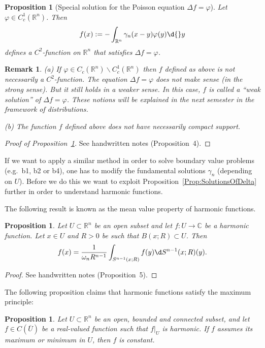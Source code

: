 \documentclass[12pt, oneside, a4paper]{article}
\newtheorem{prop}[thm]{Proposition}
\theoremstyle{dfn}
\newtheorem{rem}[thm]{Remark}
\def\Rbb{\ensuremath{\mathbb{R}}}
\newcommand{\Com}{\mathbb{C}}
\begin{document}
\begin{prop}[Special solution for the Poisson equation $\Delta f = \varphi$]\label{Prop:SolPoissonEq}
Let $\varphi \in C^1_c(\Rbb^n)$. Then
\[
f(x) := -\int_{\Rbb^n} \gamma_n(x-y) \varphi(y) \d{}y
\]
defines a $C^2$-function on $\Rbb^n$ that satisfies $\Delta f = \varphi$.
\end{prop}

\begin{rem}
(a) If $\varphi \in C_c(\Rbb^n) \smallsetminus C^1_c(\Rbb^n)$ then $f$ defined as above is not necessarily a $C^2$-function. The equation $\Delta f = \varphi$ does not make sense (in the strong sense). But it still holds in a weaker sense. In this case, $f$ is called a ``weak solution'' of $\Delta f = \varphi$. These notions will be explained in the next semester in the framework of distributions.

(b) The function $f$ defined above does not have necessarily compact support.
\end{rem}

\begin{proof}[Proof of Proposition~\ref{Prop:SolPoissonEq}]
See handwritten notes (Proposition~4). %
\end{proof}

If we want to apply a similar method in order to solve boundary value problems (e.g.\ b1, b2 or b4), one has to modify the fundamental solutions $\gamma_n$ (depending on $U$). Before we do this we want to exploit Proposition~\ref{Prop:SolutionsOfDelta} further in order to understand harmonic functions.

The following result is known as the mean value property of harmonic functions.

\begin{prop}\label{Prop:MeanValueProperty}
Let $U \subset \Rbb^n$ be an open subset and let $f \colon U \to \Com$ be a harmonic function. Let $x \in U$ and $R > 0$ be such that $B(x;R) \subset U$. Then
\[
f(x) = \frac{1}{\omega_n R^{n-1}} \int_{S^{n-1}(x;R)} f(y) \d S^{n-1}(x;R)(y).
\]
\end{prop}

\begin{proof}
See handwritten notes (Proposition~5). %
\end{proof}

The following proposition claims that harmonic functions satisfy the maximum principle:

\begin{prop}\label{Prop:MaximumPrinciple}
Let $U \subset \Rbb^n$ be an open, bounded and connected subset, and let $f \in C(\overline{U})$ be a real-valued function such that $f|_U$ is harmonic. If $f$ assumes its maximum or minimum in $U$, then $f$ is constant.
\end{prop}
\end{document}
